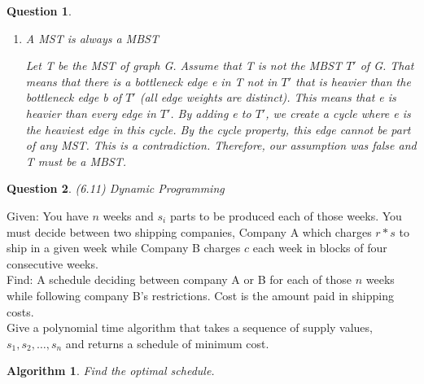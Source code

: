 \documentclass[11pt, oneside]{article}
\newtheorem{Question}{Question}
\newtheorem{Algorithm}{Algorithm}
\begin{document}
\begin{Question}
\begin{enumerate}
\item A MST is always a MBST\par
Let T be the MST of graph G. Assume that T is not the MBST $T'$ of G. That means that there is a bottleneck edge e in T not in $T'$ that is heavier than the bottleneck edge b of $T'$ (all edge weights are distinct). This means that e is heavier than every edge in $T'$. By adding e to $T'$, we create a cycle where e is the heaviest edge in this cycle. By the cycle property, this edge cannot be part of any MST. This is a contradiction. Therefore, our assumption was false and T must be a MBST. 
\end{enumerate}


\end{Question}

\newpage

\begin{Question} (6.11) Dynamic Programming
\end{Question}
\noindent Given: You have $n$ weeks and $s_i$ parts to be produced each of those weeks. You must decide between two shipping companies, Company A which charges $r * s$ to ship in a given week while Company B charges $c$ each week in blocks of four consecutive weeks.\\

\noindent Find: A schedule deciding between company A or B for each of those $n$ weeks while following company B's restrictions. Cost is the amount paid in shipping costs. \\

\noindent Give a polynomial time algorithm that takes a sequence of supply values, $s_1, s_2, \ldots , s_n$ and returns a schedule of minimum cost.

\begin{Algorithm}
Find the optimal schedule.
\end{Algorithm}
\end{document}
